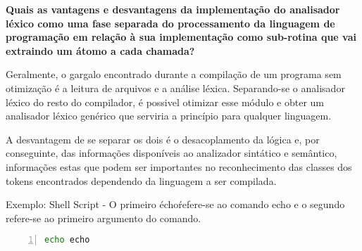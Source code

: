 
\textbf{Quais as vantagens e desvantagens da implementação do analisador léxico como uma fase separada do processamento da linguagem de programação em relação à sua implementação como sub-rotina que vai extraindo um átomo a cada chamada?}

Geralmente, o gargalo encontrado durante a compilação de um programa sem otimização é a leitura de arquivos e a análise léxica. Separando-se o analisador léxico do resto do compilador, é possivel otimizar esse módulo e obter um analisador léxico genérico que serviria a princípio para qualquer linguagem.

A desvantagem de se separar os dois é o desacoplamento da lógica e, por conseguinte, das informações disponíveis ao analizador sintático e semântico, informações estas que podem ser importantes no reconhecimento das classes dos tokens encontrados dependendo da linguagem a ser compilada.

Exemplo: Shell Script - O primeiro \'echo\' refere-se ao comando echo e o segundo refere-se ao primeiro argumento do comando.

\begin{lstlisting}[frame=single,language=bash,numbers=left]
	echo echo
\end{lstlisting}
